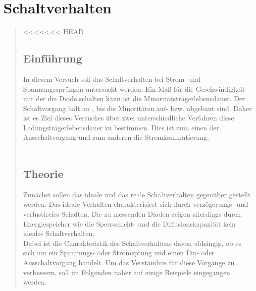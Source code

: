 \section{Schaltverhalten}
\begin{quote}

<<<<<<< HEAD
    \subsection{Einführung}

    In diesem Versuch soll das Schaltverhalten bei Strom- und Spannungssprüngen
    untersucht werden. Ein Maß für die Geschwindigkeit mit der die Diode schalten
    kann ist die Minoritätsträgerlebensdauer. Der Schaltvorgang hält an
    , bis die Minoritäten auf- bzw. abgebaut sind. Daher ist es Ziel dieses
    Versuches über zwei unterschiedliche Verfahren diese Ladungsträgerlebensdauer
    zu bestimmen. Dies ist zum einen der Ausschaltvorgang und zum anderen
    die Stromkommutierung.\\
    \\

    \subsection{Theorie}

    Zunächst sollen das ideale und das reale Schaltverhalten gegenüber gestellt
    werden. Das ideale Verhalten charakterisiert sich durch verzögerungs- und
    verlustfreies Schalten. Die zu messenden Dioden zeigen allerdings durch
    Energiespeicher wie die Sperrschicht- und die Diffusionskapazität kein
    ideales Schaltverhalten. \\

    Dabei ist die Charakteristik des Schaltverhaltens davon abhängig, ob es
    sich um ein Spannungs- oder Stromsprung und einen Ein- oder Ausschaltvorgang
    handelt. Um das Verständnis für diese Vorgänge zu verbessern, soll im
    Folgenden näher auf einige Beispiele eingegangen werden.\\


\end{quote}
